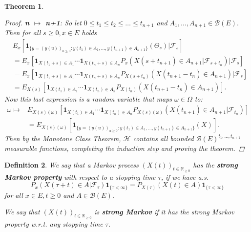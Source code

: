 \documentclass[12pt,a4paper]{scrartcl}
\newtheorem{theorem}{Theorem}[section]
\newtheorem{definition}[theorem]{Definition}
\numberwithin{equation}{section}
\newcommand{\R}{\mathbb{R}} %
\begin{document}
\begin{theorem}
\begin{proof}
\textbf{n $\mapsto$ n+1}: 
So let $0 \leq t_1 \leq t_2 \leq \ldots \leq t_{n+1}$ and $A_1,\ldots,A_{n+1} \in \mathcal{B}\left(E\right).$ Then for all $s\geq 0, x \in E$ holds
\begin{align*}
&E_x\left[\textbf{1}_{\lbrace y=\left(y\left(u\right)\right)_{u \geq 0}: y\left(t_1\right) \in A_1,\ldots, y\left(t_{n+1}\right) \in A_{n+1} \rbrace}\left( \Theta_s \right) |\mathcal{F}_s\right] \\
&=E_x\left[\textbf{1}_{X\left(t_1+s\right) \in A_1} \cdots \textbf{1}_{X\left(t_n+s\right) \in A_n} P_x\left(X\left(s+t_{n+1}\right) \in A_{n+1} |\mathcal{F}_{s+t_n}\right)  |\mathcal{F}_s\right] \\
&= E_x\left[\textbf{1}_{X\left(t_1+s\right) \in A_1} \cdots \textbf{1}_{X\left(t_n+s\right) \in A_n} P_{X\left(s+t_n\right)}\left(X\left(t_{n+1} - t_n\right) \in A_{n+1}\right)  |\mathcal{F}_s\right]\\
&= E_{X\left(s\right)}\left[ \textbf{1}_{X\left(t_1\right) \in A_1} \cdots \textbf{1}_{X\left(t_n\right) \in A_n} P_{X\left(t_n\right)}\left(X\left(t_{n+1} - t_n\right) \in A_{n+1}\right)  \right].
\end{align*}
Now this last expression is a random variable that maps $\omega \in \Omega$ to:
\begin{align*}
\omega \mapsto &E_{X\left(s\right)\left(\omega \right)}\left[ \textbf{1}_{X\left(t_1\right) \in A_1} \cdots \textbf{1}_{X\left(t_n\right) \in A_n} P_{X\left(s\right)\left(\omega \right)}\left(X\left(t_{n+1}\right) \in A_{n+1} | \mathcal{F}_{t_n}\right)  \right] \\
&= E_{X\left(s\right)\left(\omega \right)}\left[\textbf{1}_{\lbrace y=\left(y\left(u\right)\right)_{u \geq 0}: y\left(t_1\right) \in A_1,\ldots, y\left(t_{n+1}\right) \in A_{n+1} \rbrace}\left( X \right)\right].
\end{align*}
Then by the Monotone Class Theorem, $\mathcal{H}$ contains all bounded $\mathcal{B}\left(E\right)^{t_1, \ldots ,t_{n+1}}$ measurable functions, completing the induction step and proving the theorem.
\end{proof}
\end{theorem}

\begin{definition}
We say that a Markov process $\left(X\left(t\right)\right)_{t \in \R_{\geq 0}}$ has the \textbf{strong Markov property} with respect to a stopping time $ \tau $, if we have a.s.
\begin{equation} \label{eq:strongMarkovproperty}
P_x\left(X\left(\tau+t\right) \in A | \mathcal{F}_{\tau} \right) \textbf{1}_{\lbrace \tau < \infty \rbrace}= P_{X\left(\tau\right)}\left(X\left(t\right) \in A \right) \textbf{1}_{\lbrace \tau < \infty \rbrace}
\end{equation}
for all $ x \in E, t\geq 0$ and $A \in \mathcal{B}\left(E\right) $.

We say that $\left(X\left(t\right)\right)_{t \in \R_{\geq 0}}$ is \textbf{strong Markov} if it has the strong Markov property w.r.t. any stopping time $\tau$.
\end{definition}
\end{document}
